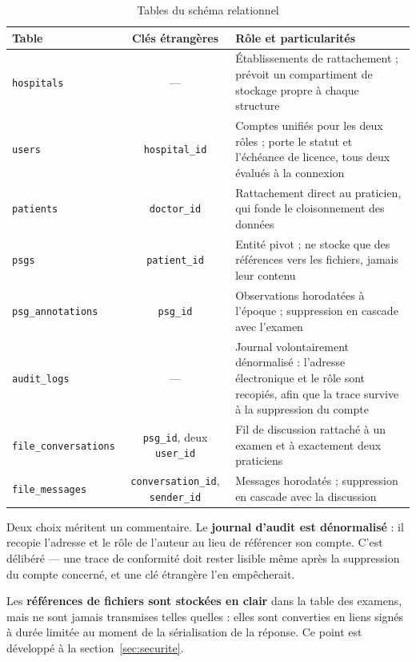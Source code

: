 \begin{table}[H]
\centering
\caption{Tables du schéma relationnel}
\label{tab:dico}
\small
\begin{tabular}{@{}lcL{8.5cm}@{}}
\toprule
\textbf{Table} & \textbf{Clés étrangères} & \textbf{Rôle et particularités} \\
\midrule
\texttt{hospitals} & --- &
Établissements de rattachement ; prévoit un compartiment de stockage propre à chaque
structure \\
\addlinespace[2pt]
\texttt{users} & \texttt{hospital\_id} &
Comptes unifiés pour les deux rôles ; porte le statut et l'échéance de licence,
tous deux évalués à la connexion \\
\addlinespace[2pt]
\texttt{patients} & \texttt{doctor\_id} &
Rattachement direct au praticien, qui fonde le cloisonnement des données \\
\addlinespace[2pt]
\texttt{psgs} & \texttt{patient\_id} &
Entité pivot ; ne stocke que des références vers les fichiers, jamais leur contenu \\
\addlinespace[2pt]
\texttt{psg\_annotations} & \texttt{psg\_id} &
Observations horodatées à l'époque ; suppression en cascade avec l'examen \\
\addlinespace[2pt]
\texttt{audit\_logs} & --- &
Journal volontairement dénormalisé : l'adresse électronique et le rôle sont recopiés,
afin que la trace survive à la suppression du compte \\
\addlinespace[2pt]
\texttt{file\_conversations} & \texttt{psg\_id}, deux \texttt{user\_id} &
Fil de discussion rattaché à un examen et à exactement deux praticiens \\
\addlinespace[2pt]
\texttt{file\_messages} & \texttt{conversation\_id}, \texttt{sender\_id} &
Messages horodatés ; suppression en cascade avec la discussion \\
\bottomrule
\end{tabular}
\end{table}

Deux choix méritent un commentaire. Le \textbf{journal d'audit est dénormalisé} : il
recopie l'adresse et le rôle de l'auteur au lieu de référencer son compte. C'est
délibéré — une trace de conformité doit rester lisible même après la suppression du
compte concerné, et une clé étrangère l'en empêcherait.

Les \textbf{références de fichiers sont stockées en clair} dans la table des examens,
mais ne sont jamais transmises telles quelles : elles sont converties en liens signés
à durée limitée au moment de la sérialisation de la réponse. Ce point est développé à
la section~\ref{sec:securite}.

